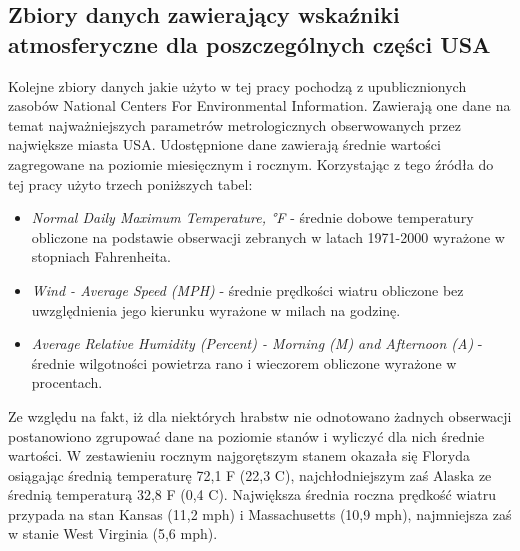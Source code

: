 \documentclass[polish, twoside, 12pt, a4paper]{article}
\theoremstyle{definition}
\theoremstyle{plain}
\theoremstyle{remark}
\begin{document}
\subsection{Zbiory danych zawierający wskaźniki atmosferyczne dla poszczególnych części USA}

Kolejne zbiory danych jakie użyto w tej pracy pochodzą z upublicznionych zasobów National Centers For Environmental Information. Zawierają one dane na temat najważniejszych parametrów metrologicznych obserwowanych przez największe miasta USA. Udostępnione dane zawierają średnie wartości zagregowane na poziomie miesięcznym i rocznym. Korzystając z tego źródła do tej pracy użyto trzech poniższych tabel:
\begin{itemize}
  \item \emph{Normal Daily Maximum Temperature, °F} - średnie dobowe temperatury obliczone na podstawie obserwacji zebranych w latach 1971-2000 wyrażone w stopniach Fahrenheita.
  \item \emph{Wind - Average Speed (MPH)} - średnie prędkości wiatru obliczone bez uwzględnienia jego kierunku wyrażone w milach na godzinę.
  \item \emph{Average Relative Humidity (Percent) - Morning (M) and Afternoon (A)} - średnie wilgotności powietrza rano i wieczorem obliczone wyrażone w procentach.
\end{itemize}

Ze względu na fakt, iż dla niektórych hrabstw nie odnotowano żadnych obserwacji postanowiono zgrupować dane na poziomie stanów i wyliczyć dla nich średnie wartości. W zestawieniu rocznym najgorętszym stanem okazała się Floryda osiągając średnią temperaturę 72,1 \textdegree F (22,3 \textdegree C), najchłodniejszym zaś Alaska ze średnią temperaturą 32,8 \textdegree F (0,4 \textdegree C). Największa średnia roczna prędkość wiatru przypada na stan Kansas (11,2 mph) i Massachusetts (10,9 mph), najmniejsza zaś w stanie West Virginia (5,6 mph). 
\end{document}
